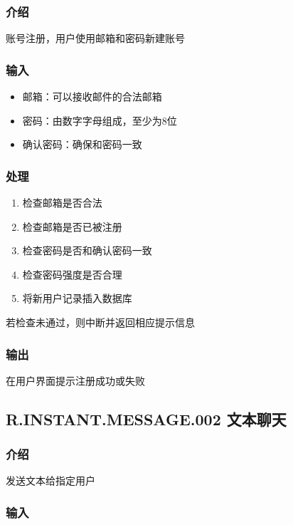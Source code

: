 \subsubsection{介绍}

账号注册，用户使用邮箱和密码新建账号

\subsubsection{输入}

\begin{itemize}
	\item 邮箱：可以接收邮件的合法邮箱
	\item 密码：由数字字母组成，至少为8位
	\item 确认密码：确保和密码一致
	\end{itemize}
\subsubsection{处理}

\begin{enumerate}
	\item 检查邮箱是否合法
	\item 检查邮箱是否已被注册
	\item 检查密码是否和确认密码一致
	\item 检查密码强度是否合理
	\item 将新用户记录插入数据库
	\end{enumerate}
若检查未通过，则中断并返回相应提示信息

\subsubsection{输出}

在用户界面提示注册成功或失败

\subsection{R.INSTANT.MESSAGE.002 文本聊天}
\subsubsection{介绍}

发送文本给指定用户

\subsubsection{输入}


